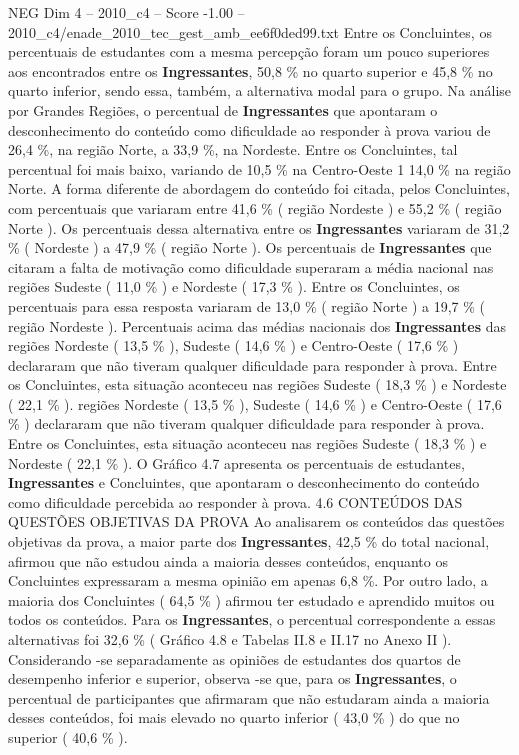 \begin{textsample}{NEG Dim 4 – 2010\_c4 – Score -1.00 – 2010\_c4/enade\_2010\_tec\_gest\_amb\_ee6f0ded99.txt}
Entre os Concluintes, os percentuais de estudantes com a mesma percepção foram um pouco superiores aos encontrados entre os \textbf{Ingressantes}, 50,8 \% no quarto superior e 45,8 \% no quarto inferior, sendo essa, também, a alternativa modal para o grupo.
Na análise por Grandes Regiões, o percentual de \textbf{Ingressantes} que apontaram o desconhecimento do conteúdo como dificuldade ao responder à prova variou de 26,4 \%, na região Norte, a 33,9 \%, na Nordeste.
Entre os Concluintes, tal percentual foi mais baixo, variando de 10,5 \% na Centro-Oeste 1 14,0 \% na região Norte.
A forma diferente de abordagem do conteúdo foi citada, pelos Concluintes, com percentuais que variaram entre 41,6 \% ( região Nordeste ) e 55,2 \% ( região Norte ).
Os percentuais dessa alternativa entre os \textbf{Ingressantes} variaram de 31,2 \% ( Nordeste ) a 47,9 \% ( região Norte ).
Os percentuais de \textbf{Ingressantes} que citaram a falta de motivação como dificuldade superaram a média nacional nas regiões Sudeste ( 11,0 \% ) e Nordeste ( 17,3 \% ).
Entre os Concluintes, os percentuais para essa resposta variaram de 13,0 \% ( região Norte ) a 19,7 \% ( região Nordeste ).
Percentuais acima das médias nacionais dos \textbf{Ingressantes} das regiões Nordeste ( 13,5 \% ), Sudeste ( 14,6 \% ) e Centro-Oeste ( 17,6 \% ) declararam que não tiveram qualquer dificuldade para responder à prova.
Entre os Concluintes, esta situação aconteceu nas regiões Sudeste ( 18,3 \% ) e Nordeste ( 22,1 \% ). regiões Nordeste ( 13,5 \% ), Sudeste ( 14,6 \% ) e Centro-Oeste ( 17,6 \% ) declararam que não tiveram qualquer dificuldade para responder à prova.
Entre os Concluintes, esta situação aconteceu nas regiões Sudeste ( 18,3 \% ) e Nordeste ( 22,1 \% ).
O Gráfico 4.7 apresenta os percentuais de estudantes, \textbf{Ingressantes} e Concluintes, que apontaram o desconhecimento do conteúdo como dificuldade percebida ao responder à prova. 4.6 CONTEÚDOS DAS QUESTÕES OBJETIVAS DA PROVA Ao analisarem os conteúdos das questões objetivas da prova, a maior parte dos \textbf{Ingressantes}, 42,5 \% do total nacional, afirmou que não estudou ainda a maioria desses conteúdos, enquanto os Concluintes expressaram a mesma opinião em apenas 6,8 \%.
Por outro lado, a maioria dos Concluintes ( 64,5 \% ) afirmou ter estudado e aprendido muitos ou todos os conteúdos.
Para os \textbf{Ingressantes}, o percentual correspondente a essas alternativas foi 32,6 \% ( Gráfico 4.8 e Tabelas II.8 e II.17 no Anexo II ).
Considerando -se separadamente as opiniões de estudantes dos quartos de desempenho inferior e superior, observa -se que, para os \textbf{Ingressantes}, o percentual de participantes que afirmaram que não estudaram ainda a maioria desses conteúdos, foi mais elevado no quarto inferior ( 43,0 \% ) do que no superior ( 40,6 \% ).

\end{textsample}
